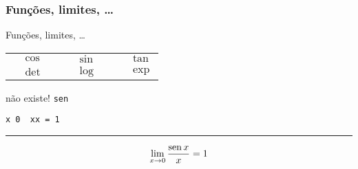 \begin{frame}

  \frametitle{Funções, limites, \dots}

  \begin{block}{Funções, limites, \dots}
    \centering
    \begin{tabular}{llllllll}
      \blue{\texttt{\string\cos}} & $\cos$ &&
      \blue{\texttt{\string\sin}} & $\sin$ &&
      \blue{\texttt{\string\tan}} & $\tan$ \\
      \blue{\texttt{\string\det}} & $\det$ &&
      \blue{\texttt{\string\log}} & $\log$ &&
      \blue{\texttt{\string\exp}} & $\exp$
    \end{tabular}
  \end{block}

  \begin{alertblock}{\texttt{\string\sen} não existe!}
    \texttt{\purple{\string\newcommand}\ac{}\blue{\string\sen}\fc{}\ac{}\green{\string\operatorname}\ac{}sen\fc{}\fc{}}
  \end{alertblock}

  \begin{exemplo}
    \texttt{\string\lim\us\ac{}x\string\to\ 0\fc{}\
      \string\frac\ac{}\blue{\string\sen}\ x\fc{}\ac{}x\fc{}\ =\ 1}

    \medskip\hrule\medskip
    \[\lim_{x\to 0} \frac{\sen x}{x} = 1\]
  \end{exemplo}

\end{frame}

